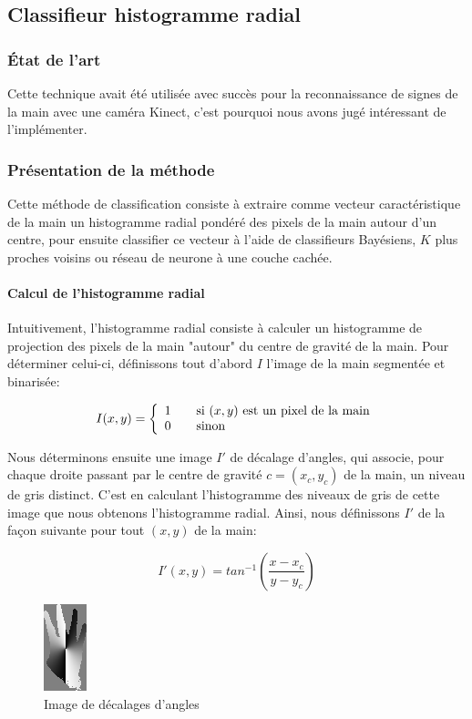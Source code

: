 \subsection{Classifieur histogramme radial}
\subsubsection{État de l'art}
Cette technique avait été utilisée avec succès pour la reconnaissance de signes de la main avec une caméra Kinect\cite{matthewTang}, c'est pourquoi nous avons jugé intéressant de l'implémenter.

\subsubsection{Présentation de la méthode}

Cette méthode de classification consiste à extraire comme vecteur caractéristique de la main un histogramme radial pondéré des pixels de la main autour d'un centre, pour ensuite classifier ce vecteur à l'aide de classifieurs Bayésiens, $K$ plus proches voisins ou réseau de neurone à une couche cachée.

\paragraph{Calcul de l'histogramme radial}
Intuitivement, l'histogramme radial consiste à calculer un histogramme de projection des pixels de la main "autour" du centre de gravité de la main. Pour déterminer celui-ci, définissons tout d'abord $I$ l'image de la main segmentée et binarisée:

\[
I(x,y) = \left\{
  \begin{array}{l l}
    1 & \quad \text{si $(x,y)$ est un pixel de la main}\\
    0 & \quad \text{sinon}
  \end{array} \right.
\]

Nous déterminons ensuite une image $I'$ de décalage d'angles, qui associe, pour chaque droite passant par le centre de gravité $c = (x_c, y_c)$ de la main, un niveau de gris distinct. C'est en calculant l'histogramme des niveaux de gris de cette image que nous obtenons l'histogramme radial. Ainsi, nous définissons $I'$ de la façon suivante pour tout $(x,y)$ de la main:

\[
I'(x,y) = tan^{-1}(\frac{x - x_c}{y - y_c})
\]

\begin{figure}[htb!]
\centerline{\includegraphics{handAngleOffsets.png}}
\caption{Image de décalages d'angles}
\label{fig:decalageAngles}
\end{figure}

